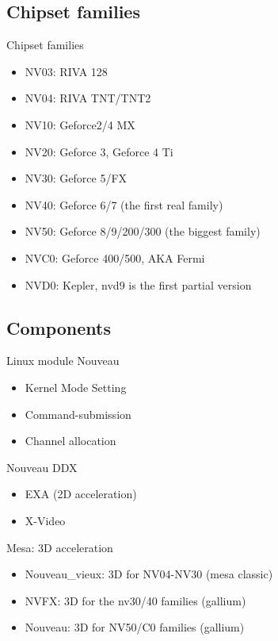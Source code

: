 \documentclass[11pt,english,compress]{beamer}
\begin{document}
	\subsection{Chipset families}
		\begin{frame}
			\begin{block}{Chipset families}
				\begin{itemize}
					\item NV03: RIVA 128
					\item NV04: RIVA TNT/TNT2
					\item NV10: Geforce2/4 MX
					\item NV20: Geforce 3, Geforce 4 Ti
					\item NV30: Geforce 5/FX
					\item NV40: Geforce 6/7 (the first real family) 
					\item NV50: Geforce 8/9/200/300 (the biggest family)
					\item NVC0: Geforce 400/500, AKA Fermi
					\item NVD0: Kepler, nvd9 is the first partial version
				\end{itemize}
			\end{block}
		\end{frame}

	\subsection{Components}
		\begin{frame}
			\begin{block}{Linux module Nouveau}
				\begin{itemize}
					\item Kernel Mode Setting
					\item Command-submission
					\item Channel allocation
				\end{itemize}
			\end{block}

			\begin{block}{Nouveau DDX}
				\begin{itemize}
					\item EXA (2D acceleration) 
					\item X-Video
				\end{itemize}
			\end{block}

			\begin{block}{Mesa: 3D acceleration}
				\begin{itemize}
					\item Nouveau\_vieux: 3D for NV04-NV30 (mesa classic)
					\item NVFX: 3D for the nv30/40 families (gallium)
					\item Nouveau: 3D for NV50/C0 families (gallium)
				\end{itemize}
			\end{block}
		\end{frame}
\end{document}
